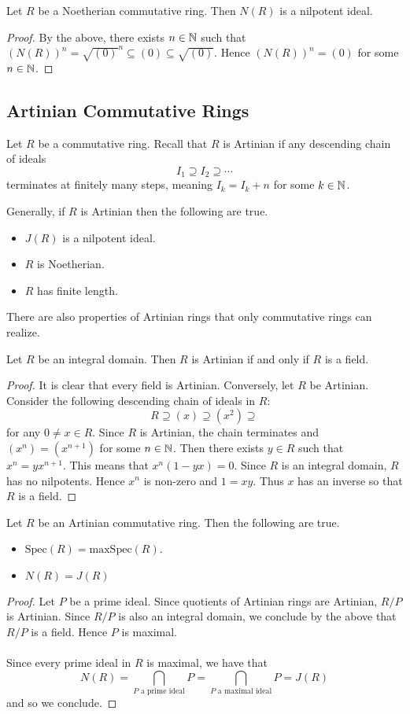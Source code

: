 \documentclass[a4paper]{article}
\begin{document}
\begin{prp}{}{} Let $R$ be a Noetherian commutative ring. Then $N(R)$ is a nilpotent ideal. 
\begin{proof}
By the above, there exists $n\in\mathbb{N}$ such that $(N(R))^n=\sqrt{(0)}^n\subseteq (0)\subseteq\sqrt{(0)}$. Hence $(N(R))^n=(0)$ for some $n\in\mathbb{N}$. 
\end{proof}
\end{prp}

\subsection{Artinian Commutative Rings}
Let $R$ be a commutative ring. Recall that $R$ is Artinian if any descending chain of ideals $$I_1\supseteq I_2\supseteq\cdots$$ terminates at finitely many steps, meaning $I_k=I_k+n$ for some $k\in\mathbb{N}$. 

Generally, if $R$ is Artinian then the following are true. 
\begin{itemize}
\item $J(R)$ is a nilpotent ideal. 
\item $R$ is Noetherian. 
\item $R$ has finite length. 
\end{itemize}

There are also properties of Artinian rings that only commutative rings can realize. 

\begin{prp}{}{} Let $R$ be an integral domain. Then $R$ is Artinian if and only if $R$ is a field. 
\begin{proof}
It is clear that every field is Artinian. Conversely, let $R$ be Artinian. Consider the following descending chain of ideals in $R$: $$R\supseteq(x)\supseteq(x^2)\supseteq$$ for any $0\neq x\in R$. Since $R$ is Artinian, the chain terminates and $(x^n)=(x^{n+1})$ for some $n\in\mathbb{N}$. Then there exists $y\in R$ such that $x^n=yx^{n+1}$. This means that $x^n(1-yx)=0$. Since $R$ is an integral domain, $R$ has no nilpotents. Hence $x^n$ is non-zero and $1=xy$. Thus $x$ has an inverse so that $R$ is a field. 
\end{proof}
\end{prp}

\begin{prp}{}{} Let $R$ be an Artinian commutative ring. Then the following are true. 
\begin{itemize}
\item $\text{Spec}(R)=\text{maxSpec}(R)$. 
\item $N(R)=J(R)$
\end{itemize}
\begin{proof}
Let $P$ be a prime ideal. Since quotients of Artinian rings are Artinian, $R/P$ is Artinian. Since $R/P$ is also an integral domain, we conclude by the above that $R/P$ is a field. Hence $P$ is maximal. \\~\\

Since every prime ideal in $R$ is maximal, we have that $$N(R)=\bigcap_{P\text{ a prime ideal}}P=\bigcap_{P\text{ a maximal ideal}}P=J(R)$$ and so we conclude. 
\end{proof}
\end{prp}
\end{document}

